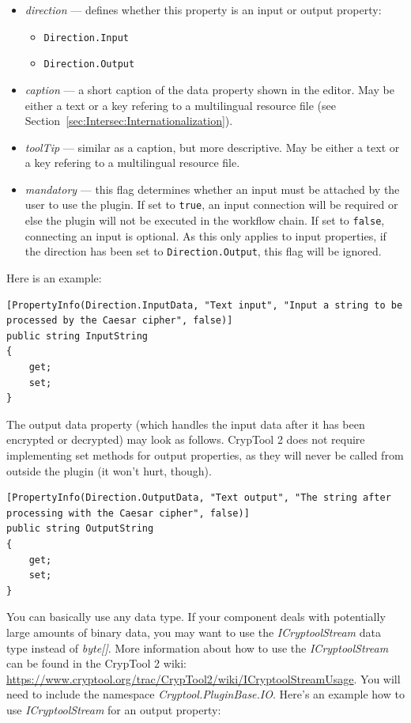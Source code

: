 \begin{itemize}
	\item \textit{direction} --- defines whether this property is an input or output property:
	\begin{itemize}
		\item \texttt{Direction.Input}
		\item \texttt{Direction.Output}
	\end{itemize}
	\item \textit{caption} --- a short caption of the data property shown in the editor. May be either a text or a key refering to a multilingual resource file (see Section~\ref{sec:Intersec:Internationalization}).
	\item \textit{toolTip} --- similar as a caption, but more descriptive. May be either a text or a key refering to a multilingual resource file.
	\item \textit{mandatory} --- this flag determines whether an input must be attached by the user to use the plugin. If set to \texttt{true}, an input connection will be required or else the plugin will not be executed in the workflow chain. If set to \texttt{false}, connecting an input is optional. As this only applies to input properties, if the direction has been set to \texttt{Direction.Output}, this flag will be ignored.

\end{itemize}

Here is an example:
\clearpage

\begin{lstlisting}
[PropertyInfo(Direction.InputData, "Text input", "Input a string to be processed by the Caesar cipher", false)]
public string InputString
{
	get;
	set;
}
\end{lstlisting}

The output data property (which handles the input data after it has been encrypted or decrypted) may look as follows. CrypTool 2 does not require implementing set methods for output properties, as they will never be called from outside the plugin (it won't hurt, though).

\begin{lstlisting}
[PropertyInfo(Direction.OutputData, "Text output", "The string after processing with the Caesar cipher", false)]
public string OutputString
{
	get;
	set;
}
\end{lstlisting}

You can basically use any data type. If your component deals with potentially large amounts of binary data, you may want to use the \textit{ICryptoolStream} data type instead of \textit{byte[]}. More information about how to use the \textit{ICryptoolStream} can be found in the CrypTool 2 wiki: \url{https://www.cryptool.org/trac/CrypTool2/wiki/ICryptoolStreamUsage}. You will need to include the namespace \textit{Cryptool.PluginBase.IO}. Here's an example how to use \textit{ICryptoolStream} for an output property:

